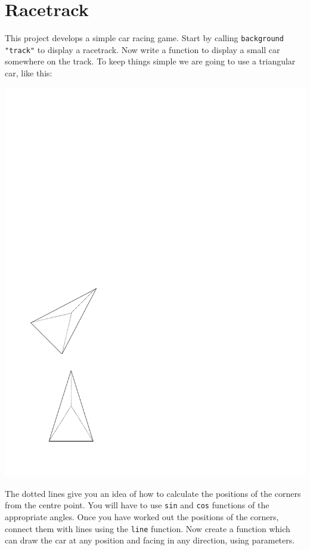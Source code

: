 \documentclass[12pt,a4paper,twoside]{article}
\renewcommand{\_}{\texttt{\symbol{95}}}
\begin{document}
\newpage
\section{Racetrack}

This project develops a simple car racing game. Start by calling
\verb^background "track"^ to display a racetrack. Now write a function
to display a small car somewhere on the track. To keep things simple
we are going to use a triangular car, like this:

\begin{center}
\includegraphics[scale=0.32,angle=-90,trim=20mm 20mm 145mm 140mm]{diagrams/car}
\end{center}

The dotted lines give you an idea of how to calculate the positions
of the corners from the centre point. You will have to use \verb^sin^ and
\verb^cos^ functions of the appropriate angles. Once you have worked out
the positions of the corners, connect them with lines using the \verb^line^
function. Now create a function which can draw the car at any position
and facing in any direction, using parameters.
\end{document}
